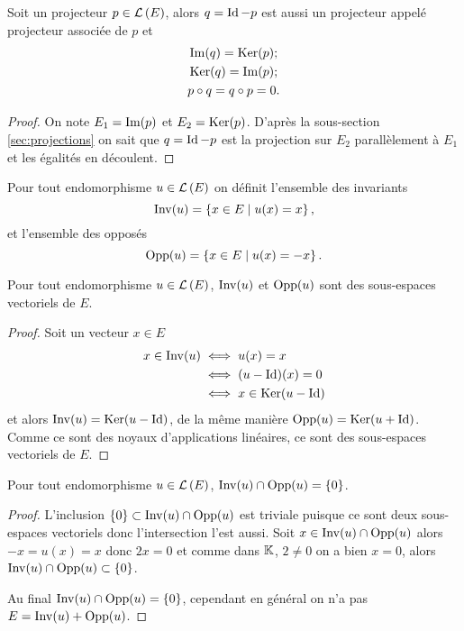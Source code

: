 \begin{prop}
  Soit un projecteur \(p \in \mathcal{L}\left(E\right)\), alors \(q=\operatorname{Id}-p\) est aussi un projecteur appelé projecteur associée de \(p\) et
  \begin{gather}
    \operatorname{Im}(q) = \operatorname{Ker}(p);\\
    \operatorname{Ker}(q)=\operatorname{Im}(p);\\
    p \circ q = q \circ p =0.
  \end{gather}
\end{prop}
\begin{proof}
  On note \(E_1 = \operatorname{Im}(p)\) et \(E_2 = \operatorname{Ker}(p)\). D'après la sous-section~
\ref{sec:projections} on sait que \(q=\operatorname{Id}-p\) est la projection sur \(E_2\) parallèlement à \(E_1\) et les égalités en découlent.
\end{proof}

\begin{defdef}
  Pour tout endomorphisme \(u \in \mathcal{L}\left(E\right)\) on définit l'ensemble des invariants
  \begin{equation}
    \operatorname{Inv}(u)=\left\{x \in E\mathrel{}\middle|\mathrel{}u(x)=x\right\},
  \end{equation}
  et l'ensemble des opposés
  \begin{equation}
    \operatorname{Opp}(u)=\left\{x \in E\mathrel{}\middle|\mathrel{}u(x)=-x\right\}.
  \end{equation}
\end{defdef}

\begin{prop}
  Pour tout endomorphisme \(u \in \mathcal{L}\left(E\right)\), \(\operatorname{Inv}(u)\) et \(\operatorname{Opp}(u)\) sont des sous-espaces vectoriels de \(E\).
\end{prop}
\begin{proof}
  Soit un vecteur \(x \in E\)
  \begin{align}
    x \in \operatorname{Inv}(u) &\iff u(x) = x \\
    &\iff (u-\operatorname{Id})(x)=0 \\
    &\iff x \in \operatorname{Ker}(u-\operatorname{Id})
  \end{align}
  et alors \(\operatorname{Inv}(u) = \operatorname{Ker}(u-\operatorname{Id})\), de la même manière \(\operatorname{Opp}(u) = \operatorname{Ker}(u+\operatorname{Id})\). Comme ce sont des noyaux d'applications linéaires, ce sont des sous-espaces vectoriels de \(E\).
\end{proof}

\begin{prop}
  Pour tout endomorphisme \(u \in \mathcal{L}\left(E\right)\), \(\operatorname{Inv}(u) \cap \operatorname{Opp}(u) = \{0\}\).
\end{prop}
\begin{proof}
  L'inclusion \(\{0\} \subset \operatorname{Inv}(u) \cap \operatorname{Opp}(u)\) est triviale puisque ce sont deux sous-espaces vectoriels donc l'intersection l'est aussi. Soit \(x \in \operatorname{Inv}(u) \cap \operatorname{Opp}(u)\) alors \(-x=u(x)=x\) donc \(2x=0\) et comme dans \(\mathbb{K}\), \(2\neq 0\) on a bien \(x=0\), alors \(\operatorname{Inv}(u) \cap \operatorname{Opp}(u) \subset \{0\}\).

  Au final \(\operatorname{Inv}(u) \cap \operatorname{Opp}(u) = \{0\}\), cependant en général on n'a pas \(E = \operatorname{Inv}(u)+\operatorname{Opp}(u)\).
\end{proof}

